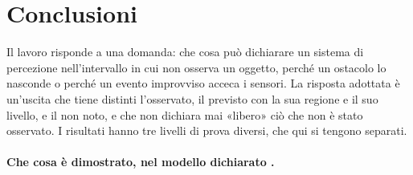 \section{Conclusioni}\label{sec:con}

Il lavoro risponde a una domanda: che cosa può dichiarare un sistema di percezione nell'intervallo in cui non osserva un oggetto, perché un ostacolo lo nasconde o perché un evento improvviso acceca i sensori. La risposta adottata è un'uscita che tiene distinti l'osservato, il previsto con la sua regione e il suo livello, e il non noto, e che non dichiara mai «libero» ciò che non è stato osservato. I risultati hanno tre livelli di prova diversi, che qui si tengono separati.

\paragraph{Che cosa è dimostrato, nel modello dichiarato .}
